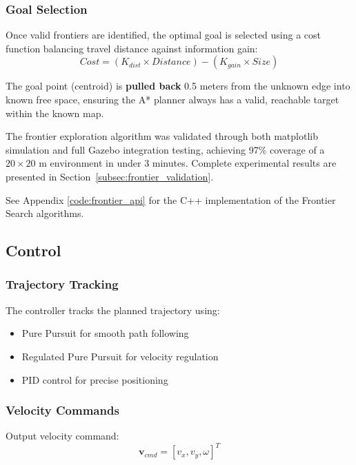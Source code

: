 \subsubsection{Goal Selection}

Once valid frontiers are identified, the optimal goal is selected using a cost function balancing travel distance against information gain:
\begin{equation}
Cost = (K_{dist} \times Distance) - (K_{gain} \times Size)
\label{eq:frontier_cost}
\end{equation}

The goal point (centroid) is \textbf{pulled back} 0.5 meters from the unknown edge into known free space, ensuring the A* planner always has a valid, reachable target within the known map.

The frontier exploration algorithm was validated through both matplotlib simulation and full Gazebo integration testing, achieving 97\% coverage of a $20 \times 20$ m environment in under 3 minutes. Complete experimental results are presented in Section~\ref{subsec:frontier_validation}.

See Appendix \ref{code:frontier_api} for the C++ implementation of the Frontier Search algorithms.

\subsection{Control}
\label{subsec:control}

\subsubsection{Trajectory Tracking}
The controller tracks the planned trajectory using:
\begin{itemize}
    \item Pure Pursuit for smooth path following
    \item Regulated Pure Pursuit for velocity regulation
    \item PID control for precise positioning
\end{itemize}

\subsubsection{Velocity Commands}
Output velocity command:
\begin{equation}
\mathbf{v}_{cmd} = [v_x, v_y, \omega]^T
\label{eq:vel_cmd}
\end{equation}

